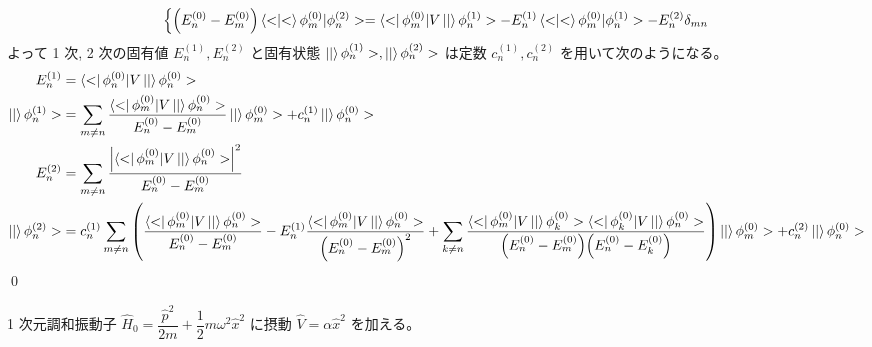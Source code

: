\documentclass[uplatex,dvipdfmx,a4paper,11pt]{jlreq}
\makeatletter
\numberwithin{equation}{section}
\theoremstyle{definition}
\renewenvironment{proof}[1][\proofname]{\par
  \normalfont
  \topsep6\p@\@plus6\p@ \trivlist
  \item[\hskip\labelsep{\bfseries #1}\@addpunct{\bfseries}]\ignorespaces\quad\par
}{%
  \qed\endtrivlist\@endpefalse
}
\renewcommand\proofname{証明}
\makeatother
\begin{document}
\begin{proof}
\begin{align}
\begin{dcases}
             \qty(E_n^{(0)} - E_m^{(0)})\braket<\phi_m^{(0)}|\phi_n^{(2)}> = \bra<\phi_m^{(0)}|V\ket|\phi_n^{(1)}> - E_n^{(1)}\braket<\phi_m^{(0)}|\phi_n^{(1)}> - E_n^{(2)}\delta_{mn}
           \end{dcases}
  \end{align}
  よって 1 次, 2 次の固有値 $E_n^{(1)}, E_n^{(2)}$ と固有状態 $\ket|\phi_n^{(1)}>, \ket|\phi_n^{(2)}>$ は定数 $c_n^{(1)}, c_n^{(2)}$ を用いて次のようになる。
  \begin{align}
    E_n^{(1)}          & = \bra<\phi_n^{(0)}|V\ket|\phi_n^{(0)}>                                                                                                                                                                                                                                                                                                                                                             \\
    \ket|\phi_n^{(1)}> & = \sum_{m\neq n}\frac{\bra<\phi_m^{(0)}|V\ket|\phi_n^{(0)}>}{E_n^{(0)} - E_m^{(0)}}\ket|\phi_m^{(0)}> + c_n^{(1)}\ket|\phi_n^{(0)}>                                                                                                                                                                                                                                                                 \\
    E_n^{(2)}          & = \sum_{m\neq n}\frac{\qty|{\bra<\phi_m^{(0)}|V\ket|\phi_n^{(0)}>}|^2}{E_n^{(0)} - E_m^{(0)}}                                                                                                                                                                                                                                                                                                       \\
    \ket|\phi_n^{(2)}> & = c_n^{(1)}\sum_{m\neq n}\qty(\frac{\bra<\phi_m^{(0)}|V\ket|\phi_n^{(0)}>}{E_n^{(0)} - E_m^{(0)}} - E_n^{(1)}\frac{\bra<\phi_m^{(0)}|V\ket|\phi_n^{(0)}>}{\qty(E_n^{(0)} - E_m^{(0)})^2} + \sum_{k\neq n}\frac{\bra<\phi_m^{(0)}|V\ket|\phi_k^{(0)}>\bra<\phi_k^{(0)}|V\ket|\phi_n^{(0)}>}{\qty(E_n^{(0)} - E_m^{(0)})\qty(E_n^{(0)} - E_k^{(0)})})\ket|\phi_m^{(0)}> + c_n^{(2)}\ket|\phi_n^{(0)}>
  \end{align}
\end{proof}

\begin{proposition}
  1 次元調和振動子 $\hat{H}_0 = \dfrac{\hat{p}^2}{2m} + \dfrac{1}{2}m\omega^2\hat{x}^2$ に摂動 $\hat{V} = \alpha\hat{x}^2$ を加える。
\end{proposition}
\end{document}
